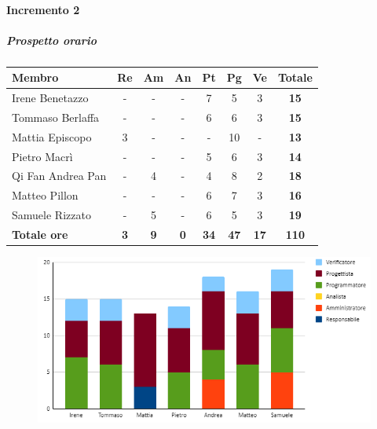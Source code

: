 \paragraph{Incremento 2}
\subparagraph{Prospetto orario}
\begin{center}
	\renewcommand{\arraystretch}{1.8} %
	\begin{tabular}{ |m{10em}|c|c|c|c|c|c|c| }
	\hline
	\textbf{Membro} & \textbf{Re} & \textbf{Am} &  \textbf{An} &  \textbf{Pt} &  \textbf{Pg} &  \textbf{Ve} &  \textbf{Totale}\\
    \hline
    Irene Benetazzo   & - & - & - & 7 & 5 & 3 & \textbf{15} \\
    \hline
    Tommaso Berlaffa  & - & - & - & 6 & 6 & 3 & \textbf{15} \\
    \hline
    Mattia Episcopo   & 3 & - & - & - & 10 & - & \textbf{13} \\
    \hline
    Pietro Macrì      & - & - & - & 5 & 6 & 3 & \textbf{14} \\
    \hline
    Qi Fan Andrea Pan & - & 4 & - & 4 & 8 & 2 & \textbf{18} \\
    \hline
    Matteo Pillon     & - & - & - & 6 & 7 & 3 & \textbf{16} \\
    \hline
    Samuele Rizzato   & - & 5 & - & 6 & 5 & 3 & \textbf{19} \\
    \hline
    \textbf{Totale ore} & \textbf{3} & \textbf{9} &  \textbf{0} &  \textbf{34} &  \textbf{47} &  \textbf{17} &  \textbf{110}\\
    \hline
	\end{tabular}
\end{center}
\begin{figure}[H]
   \centering\includegraphics{images/preventivo/PB-incremento2-ore.png}
\end{figure}

